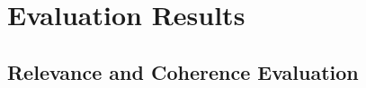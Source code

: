 


\section{Evaluation Results }
\label{sec:benchmark}




\subsection{Relevance and Coherence Evaluation}


